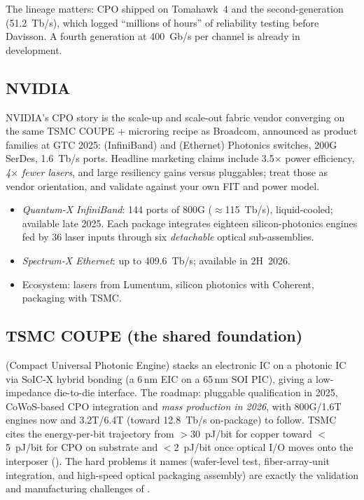 The lineage matters: CPO shipped on Tomahawk~4 and the second-generation
 (51.2~Tb/s), which logged ``millions of hours'' of reliability
testing before Davisson. A fourth generation at 400~Gb/s per channel is already in
development.

\subsection{NVIDIA}

NVIDIA's CPO story is the scale-up and scale-out fabric vendor converging on the
same TSMC COUPE + microring recipe as Broadcom, announced as product families at
GTC 2025:  (InfiniBand) and  (Ethernet) Photonics
switches, 200G SerDes, 1.6~Tb/s ports. Headline marketing claims include
3.5$\times$ power efficiency, \emph{4$\times$ fewer lasers}, and large resiliency
gains versus pluggables; treat those as vendor orientation, and validate against
your own FIT and power model.

\begin{itemize}
\item \emph{Quantum-X InfiniBand}: 144 ports of 800G ($\approx$115~Tb/s),
      liquid-cooled; available late 2025. Each package integrates eighteen
      silicon-photonics engines fed by 36 laser inputs through six
      \emph{detachable} optical sub-assemblies.
\item \emph{Spectrum-X Ethernet}: up to 409.6~Tb/s; available in 2H~2026.
\item Ecosystem: lasers from Lumentum, silicon photonics with Coherent, packaging
      with TSMC.
\end{itemize}

\subsection{TSMC COUPE (the shared foundation)}

 (Compact Universal Photonic Engine) stacks an electronic IC on a
photonic IC via SoIC-X hybrid bonding (a 6\,nm EIC on a 65\,nm SOI PIC), giving a
low-impedance die-to-die interface. The roadmap: pluggable qualification in 2025,
CoWoS-based CPO integration and \emph{mass production in 2026}, with 800G/1.6T
engines now and 3.2T/6.4T (toward 12.8~Tb/s on-package) to follow. TSMC cites the
energy-per-bit trajectory from $>$30~pJ/bit for copper toward $<$5~pJ/bit for CPO
on substrate and $<$2~pJ/bit once optical I/O moves onto the interposer
(). The hard problems it names (wafer-level test, fiber-array-unit
integration, and high-speed optical packaging assembly) are exactly the
validation and manufacturing challenges of
.

